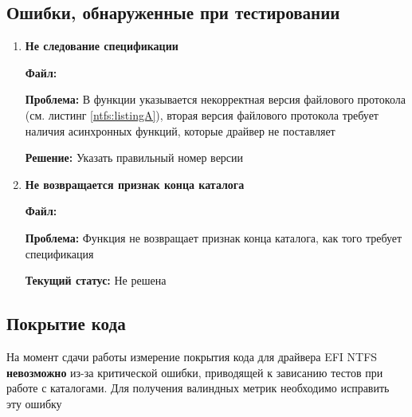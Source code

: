 \subsection{Ошибки, обнаруженные при тестировании}
\begin{enumerate}
	\item \textbf{Не следование спецификации}
	
	\textbf{Файл:} 
	
	\textbf{Проблема:} В функции  указывается некорректная версия файлового протокола (см. листинг \ref{ntfs:listingA}), вторая версия файлового протокола требует наличия асинхронных функций, которые драйвер не поставляет \cite{UEFISpec}
    
    \textbf{Решение:} Указать правильный номер версии
	 
	
	\item \textbf{Не возвращается признак конца каталога}
	
	\textbf{Файл:} 
	
	\textbf{Проблема:} Функция  не возвращает признак конца каталога, как того требует спецификация \cite{UEFISpec}
	
	\textbf{Текущий статус:} Не решена
\end{enumerate}

\subsection{Покрытие кода}
На момент сдачи работы измерение покрытия кода для драйвера EFI NTFS \textbf{невозможно} из-за критической ошибки, приводящей к зависанию тестов при работе с каталогами. Для получения валиндных метрик необходимо исправить эту ошибку 